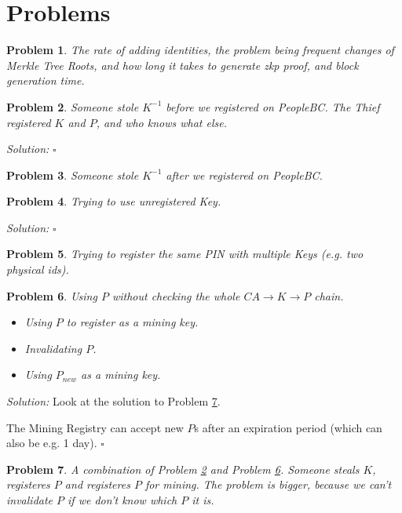 \documentclass{article}
\newtheorem{problem}{Problem}
\newenvironment{solution}
  {\emph{Solution:}}
  {\hfill $\square$}
\newcommand{\pbc}{\textit{PeopleBC}}
\begin{document}
\section{Problems}
\begin{problem}
  The rate of adding identities, the problem being frequent changes of Merkle Tree Roots, and how long it takes to generate zkp proof, and block generation time.
\end{problem}
\begin{problem}
\label{prob:bigsteal}
  Someone stole $K^{-1}$ before we registered on \pbc.
  The Thief registered $K$ and $P$, and who knows what else.
\end{problem}
\begin{solution}
\end{solution}
\begin{problem}
  Someone stole $K^{-1}$ after we registered on \pbc.
\end{problem}
\begin{problem}
Trying to use unregistered Key.
\end{problem}
\begin{solution}
\end{solution}
\begin{problem}
Trying to register the same PIN with multiple Keys (e.g. two physical ids).
\end{problem}
\begin{problem}
\label{prob:chain}
  Using $P$ without checking the whole $CA\rightarrow K\rightarrow P$ chain.
  \begin{itemize}
    \item Using $P$ to register as a mining key.
    \item Invalidating $P$.
    \item Using $P_{new}$ as a mining key.
  \end{itemize}
\end{problem}
\begin{solution}
  Look at the solution to Problem \ref{prob:miningKey}.

  The Mining Registry can accept new $P$s after an expiration period (which can also be e.g. 1 day).
\end{solution}
\begin{problem}
\label{prob:miningKey}
  A combination of Problem \ref{prob:bigsteal} and Problem \ref{prob:chain}.
  Someone steals $K$, registeres $P$ and registeres $P$ for mining.
  The problem is bigger, because we can't invalidate $P$ if we don't know which $P$ it is.
\end{problem}
\end{document}

